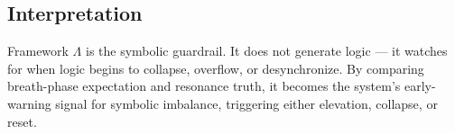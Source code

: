 \subsection*{Interpretation}

Framework $\Lambda$ is the symbolic guardrail. It does not generate logic — it watches for when logic begins to collapse, overflow, or desynchronize. By comparing breath-phase expectation and resonance truth, it becomes the system’s early-warning signal for symbolic imbalance, triggering either elevation, collapse, or reset.

